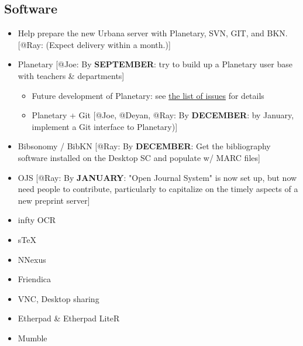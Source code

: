\subsection*{Software}
\begin{itemize}
\item Help prepare the new Urbana server with Planetary, SVN, GIT, and BKN.  [@Ray: (Expect delivery within a month.)]
\item Planetary [@Joe: By {\bf SEPTEMBER}: try to build up a Planetary
  user base with teachers \& departments]
  \begin{itemize}
  \item Future development of Planetary: see 
  \href{https://github.com/cdavid/drupal_planetary/issues?milestone=1&page=1&state=open}{the list of issues} for details
  \item Planetary + Git [@Joe, @Deyan, @Ray: By {\bf DECEMBER}: 
    by January, implement a Git interface to
    Planetary)]
  \end{itemize}
\item Bibsonomy / BibKN [@Ray: By {\bf DECEMBER}: Get the bibliography
  software installed on the Desktop SC and populate w/
  MARC files]
\item OJS [@Ray: By {\bf JANUARY}: "Open Journal System" is
  now set up, but now need people to contribute,
  particularly to capitalize on the timely aspects of a
  new preprint server]
\item infty OCR
\item sTeX
\item NNexus
\item Friendica
\item VNC, Desktop sharing
\item Etherpad \& Etherpad LiteR
\item Mumble
\end{itemize}

